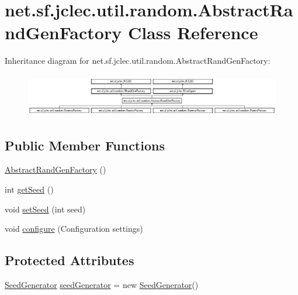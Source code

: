\hypertarget{classnet_1_1sf_1_1jclec_1_1util_1_1random_1_1_abstract_rand_gen_factory}{\section{net.\-sf.\-jclec.\-util.\-random.\-Abstract\-Rand\-Gen\-Factory Class Reference}
\label{classnet_1_1sf_1_1jclec_1_1util_1_1random_1_1_abstract_rand_gen_factory}
}
Inheritance diagram for net.\-sf.\-jclec.\-util.\-random.\-Abstract\-Rand\-Gen\-Factory\-:\begin{figure}[H]
\begin{center}
\leavevmode
\includegraphics[height=1.898305cm]{classnet_1_1sf_1_1jclec_1_1util_1_1random_1_1_abstract_rand_gen_factory}
\end{center}
\end{figure}
\subsection*{Public Member Functions}
\begin{DoxyCompactItemize}
\item 
\hyperlink{classnet_1_1sf_1_1jclec_1_1util_1_1random_1_1_abstract_rand_gen_factory_a951485e5b8b752b7bf3c11558238e25b}{Abstract\-Rand\-Gen\-Factory} ()
\item 
int \hyperlink{classnet_1_1sf_1_1jclec_1_1util_1_1random_1_1_abstract_rand_gen_factory_a7079e322cbf8af86411018419fa4258f}{get\-Seed} ()
\item 
void \hyperlink{classnet_1_1sf_1_1jclec_1_1util_1_1random_1_1_abstract_rand_gen_factory_ac87c545525657b0dee889c52c42ce58d}{set\-Seed} (int seed)
\item 
void \hyperlink{classnet_1_1sf_1_1jclec_1_1util_1_1random_1_1_abstract_rand_gen_factory_adbcc614c5ec7ae7d3a161286f2e5f741}{configure} (Configuration settings)
\end{DoxyCompactItemize}
\subsection*{Protected Attributes}
\begin{DoxyCompactItemize}
\item 
\hyperlink{classnet_1_1sf_1_1jclec_1_1util_1_1random_1_1_seed_generator}{Seed\-Generator} \hyperlink{classnet_1_1sf_1_1jclec_1_1util_1_1random_1_1_abstract_rand_gen_factory_ae3ca4d4c2dd0f8b276b2ef5d9725dae8}{seed\-Generator} = new \hyperlink{classnet_1_1sf_1_1jclec_1_1util_1_1random_1_1_seed_generator}{Seed\-Generator}()
\end{DoxyCompactItemize}


